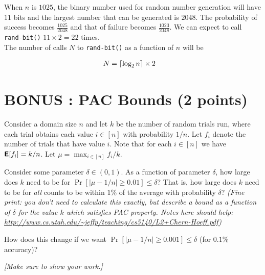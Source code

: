 \documentclass[11pt]{article}
\DeclarePairedDelimiter\ceil{\lceil}{\rceil}
\begin{document}
When $n$ is $1025$, the binary number used for random number generation will have $11$ bits and the largest number that can be generated is $2048$. The probability of success becomes $\frac{1025}{2048}$ and that of failure becomes $\frac{1023}{2048}$. We can expect to call \texttt{rand-bit()} $11 \times 2 = 22$ times.\\

The number of calls $N$ to \texttt{rand-bit()} as a function of $n$ will be

\begin{equation*}
\begin{aligned}
N &= \ceil*{\log_2 {n}} \times 2
\end{aligned}
\end{equation*}

\vspace{-.1in}
\section{BONUS : PAC Bounds (2 points)}

Consider a domain size $n$ and let $k$ be the number of random trials run, where each trial obtains each value $i \in [n]$ with probability $1/n$.  
Let $f_i$ denote the number of trials that have value $i$.  
Note that for each $i \in [n]$ we have $\textbf{\textsf{E}}[f_i] = k/n$.  
Let $\mu = \max_{i \in [n]} f_i/k$.  

Consider some parameter $\delta \in (0,1)$.  
As a function of parameter $\delta$, how large does $k$ need to be for 
$\Pr[ |\mu - 1/n| \geq 0.01] \leq \delta$?
That is, how large does $k$ need to be for \emph{all} counts to be within $1\%$ of the average with probability $\delta$? 
\emph{(Fine print:  you don't need to calculate this exactly, but describe a bound as a function of $\delta$ for the value $k$ which satisfies PAC property.  Notes here should help: \url{http://www.cs.utah.edu/~jeffp/teaching/cs5140/L2+Chern-Hoeff.pdf})}

How does this change if we want
$\Pr[ |\mu - 1/n| \geq 0.001] \leq \delta$ (for $0.1\%$ accuracy)?

\emph{[Make sure to show your work.]}
\end{document}
